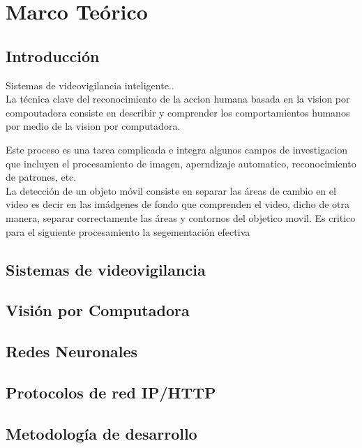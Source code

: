 \chapter{Marco Teórico}


\section{Introducción}

Sistemas de videovigilancia inteligente..\\

La técnica clave del reconocimiento de la accion humana basada en la vision  por compoutadora consiste en describir y comprender los comportamientos humanos por medio de la vision por computadora.

Este proceso es una tarea complicada e integra algunos campos de investigacion que incluyen el procesamiento de imagen, aperndizaje automatico, reconocimiento de patrones, etc.\\

La detección de un objeto móvil consiste en separar las áreas de cambio en el video es decir en las imádgenes de fondo que comprenden el video, dicho de otra manera, separar correctamente las áreas y contornos del objetico movil. Es critico para el siguiente procesamiento la segementación efectiva 

\section{Sistemas de videovigilancia}

\section{Visión por Computadora}

\section{Redes Neuronales}

\section{Protocolos de red IP/HTTP}

\section{Metodología de desarrollo}
